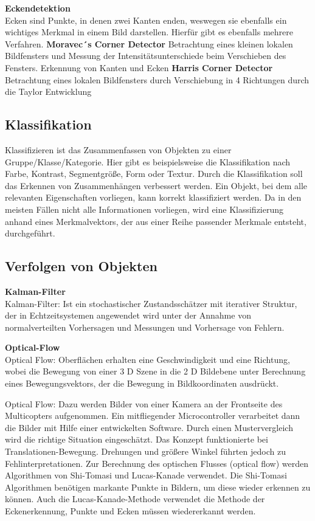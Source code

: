     \textbf{Eckendetektion}\\
    Ecken sind Punkte, in denen zwei Kanten enden, weswegen sie ebenfalls ein wichtiges Merkmal in einem Bild darstellen. Hierfür gibt es ebenfalls mehrere Verfahren.
    \textbf{Moravec´s Corner Detector} Betrachtung eines kleinen lokalen Bildfensters und Messung der Intensitätsunterschiede beim Verschieben des Fensters. Erkennung von Kanten und Ecken
    \textbf{Harris Corner Detector} Betrachtung eines lokalen Bildfensters durch Verschiebung in 4 Richtungen durch die Taylor Entwicklung


    \subsection*{Klassifikation} 
    Klassifizieren ist das Zusammenfassen von Objekten zu einer Gruppe/Klasse/Kategorie. Hier gibt es beispielsweise die Klassifikation nach Farbe, Kontrast, Segmentgröße, Form oder Textur. Durch die Klassifikation soll das Erkennen von Zusammenhängen verbessert werden. Ein Objekt, bei dem alle relevanten Eigenschaften vorliegen, kann korrekt klassifiziert werden. Da in den meisten Fällen nicht alle Informationen vorliegen, wird eine Klassifizierung anhand eines Merkmalvektors, der aus einer Reihe passender Merkmale entsteht, durchgeführt. \cite{Bildverarbeitung}
   
    \subsection*{Verfolgen von Objekten}
    \textbf{Kalman-Filter}\\
    Kalman-Filter: Ist ein stochastischer Zustandsschätzer mit iterativer Struktur, der in Echtzeitsystemen angewendet wird unter der Annahme von normalverteilten Vorhersagen und Messungen und Vorhersage von Fehlern.

    \textbf{Optical-Flow}\\
    Optical Flow: Oberflächen erhalten eine Geschwindigkeit und eine Richtung, wobei die Bewegung von einer 3 D Szene in die 2 D Bildebene unter Berechnung eines Bewegungsvektors, der die Bewegung in Bildkoordinaten ausdrückt.

    Optical Flow:
    Dazu werden Bilder von einer Kamera an der Frontseite des Multicopters aufgenommen. Ein mitfliegender Microcontroller verarbeitet dann die Bilder mit Hilfe einer entwickelten Software. Durch einen Mustervergleich wird die richtige Situation eingeschätzt. Das Konzept funktionierte bei Translationen-Bewegung. Drehungen und größere Winkel führten jedoch zu Fehlinterpretationen. Zur Berechnung des optischen Flusses (optical flow) werden Algorithmen von Shi-Tomasi und Lucas-Kanade verwendet. Die Shi-Tomasi Algorithmen benötigen markante Punkte in Bildern, um diese wieder erkennen zu können. Auch die Lucas-Kanade-Methode verwendet die Methode der Eckenerkennung, Punkte und Ecken müssen wiedererkannt werden. \cite{opticalflow}

